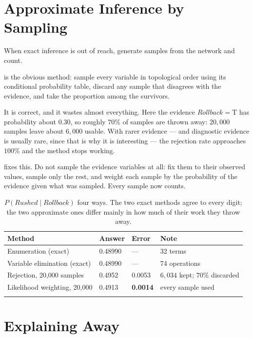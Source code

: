 \section{Approximate Inference by Sampling}

When exact inference is out of reach, generate samples from the network and count.

 is the obvious method: sample every variable in
topological order using its conditional probability table, discard any sample that
disagrees with the evidence, and take the proportion among the survivors.

It is correct, and it wastes almost everything. Here the evidence
$\mathit{Rollback} = \text{T}$ has probability about $0.30$, so roughly $70\%$ of
samples are thrown away: $20{,}000$ samples leave about $6{,}000$ usable. With
rarer evidence --- and diagnostic evidence is usually rare, since that is why it is
interesting --- the rejection rate approaches $100\%$ and the method stops working.

 fixes this. Do not sample the evidence variables at all:
fix them to their observed values, sample only the rest, and weight each sample by
the probability of the evidence given what was sampled. Every sample now counts.

\smallskip
\noindent\begin{longtable}{@{}L{4.4cm}L{2.7cm}L{2.7cm}L{4.4cm}@{}}
\toprule
{}
\textbf{Method} & \textbf{Answer} & \textbf{Error} & \textbf{Note} \\
\midrule
\endhead
Enumeration (exact) & 0.48990 & --- & 32 terms \\
Variable elimination (exact) & 0.48990 & --- & 74 operations \\
Rejection, 20{,}000 samples & 0.4952 & 0.0053 & $6{,}034$ kept; $70\%$ discarded \\
Likelihood weighting, 20{,}000 & 0.4913 & \textbf{0.0014} & every sample used \\
\bottomrule
\caption{$P(\mathit{Rushed} \mid \mathit{Rollback})$ four ways. The two exact
methods agree to every digit; the two approximate ones differ mainly in how much
of their work they throw away.}\label{tab:bn-inference}
\end{longtable}

\section{Explaining Away}

